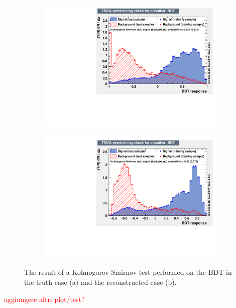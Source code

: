 \documentclass[10pt,a4paper]{book}
\newcommand\todo[1]{\textcolor{red}{#1}}
\begin{document}
\begin{figure}[h]
\begin{subfigure}{1.0\textwidth}
\centering
\includegraphics[scale=0.7]{ch4_images/BDT_overtraining_truth}
\caption{}
\end{subfigure}
\begin{subfigure}{1.0\textwidth}
\centering
\includegraphics[scale=0.7]{ch4_images/BDT_overtraining_reco}
\caption{}
\end{subfigure}
\caption{The result of a Kolmogorov-Smirnov test performed on the BDT in the truth case (a) and the reconstructed case (b).}
\label{correlation reco}
\end{figure} 



\todo{aggiungere altri plot/test?}
\end{document}
